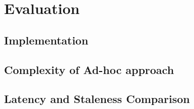 \section{Evaluation}
\subsection{Implementation}
\subsection{Complexity of Ad-hoc approach}
\subsection{Latency and Staleness Comparison}

